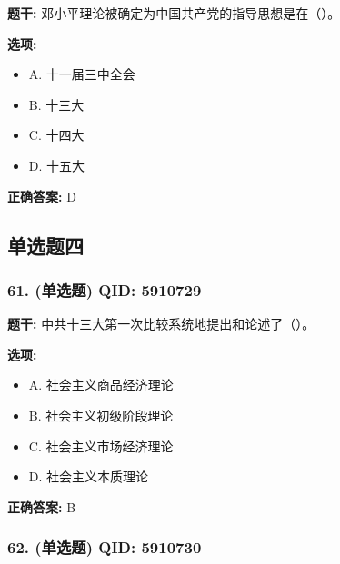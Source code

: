 \documentclass[12pt,UTF8]{ctexart}
\begin{document}
\textbf{题干:}
邓小平理论被确定为中国共产党的指导思想是在（）。

\textbf{选项:}
\begin{itemize}[leftmargin=*]

  \item A. 十一届三中全会

  \item B. 十三大

  \item C. 十四大

  \item D. 十五大

\end{itemize}

\textbf{正确答案:}
D

\vspace{0.3em}\hrulefill\vspace{0.7em}

\subsection*{单选题四}

\subsubsection*{61. (单选题) \small QID: 5910729}

\textbf{题干:}
中共十三大第一次比较系统地提出和论述了（）。

\textbf{选项:}
\begin{itemize}[leftmargin=*]

  \item A. 社会主义商品经济理论

  \item B. 社会主义初级阶段理论

  \item C. 社会主义市场经济理论

  \item D. 社会主义本质理论

\end{itemize}

\textbf{正确答案:}
B

\vspace{0.3em}\hrulefill\vspace{0.7em}

\subsubsection*{62. (单选题) \small QID: 5910730}
\end{document}
